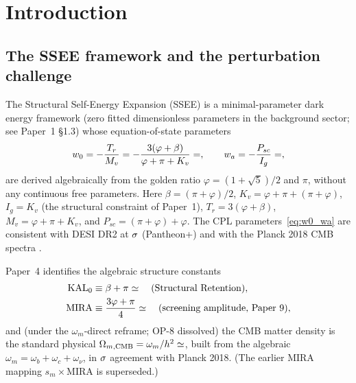 \documentclass[12pt,a4paper]{article}
\newcommand{\KALz}{\mathrm{KAL}_0}
\begin{document}
\clearpage
{\small\tableofcontents}
\clearpage

\section{Introduction}
\label{sec:intro}

\subsection{The SSEE framework and the perturbation challenge}
\label{subsec:intro_ssee}

The Structural Self-Energy Expansion (SSEE) \citep{SSEE_Paper1} is a
minimal-parameter dark energy framework (zero fitted dimensionless parameters
in the background sector; see Paper~1 \S1.3) whose equation-of-state parameters
\begin{equation}
  w_0 = -\frac{T_r}{M_v}
  = -\frac{3(\varphi+\beta)}{\varphi+\pi+K_v}
  = \val{W0_d6}, \qquad
  w_a = -\frac{P_{sc}}{I_g} = \val{WA_d6},
  \label{eq:w0_wa}
\end{equation}
are derived algebraically from the golden ratio $\varphi=(1+\sqrt{5})/2$ and $\pi$,
without any continuous free parameters.
Here $\beta=(\pi+\varphi)/2$, $K_v=\varphi+\pi+(\pi+\varphi)$, $I_g = K_v$ (the
structural constraint of Paper~1),
$T_r=3(\varphi+\beta)$, $M_v=\varphi+\pi+K_v$, and $P_{sc}=(\pi+\varphi)+\varphi$.
The CPL parameters~\eqref{eq:w0_wa} \citep{ChevallierPolarski2001,Linder2003} are consistent with DESI DR2 at $\val{p2_w0wa_ssee_ec26}\sigma$ (Pantheon+)
\citep{SSEE_Paper2,AbdulKarim2025} and with the Planck 2018 CMB spectra \citep{SSEE_Paper3}.

Paper~4 \citep{SSEE_Paper4} identifies the algebraic structure constants
\begin{align}
  \KALz &\equiv \beta + \pi \simeq \val{KAL0_d4}
  \quad\text{(Structural Retention)}, \\
  \mathrm{MIRA} &\equiv \frac{3\varphi+\pi}{4} \simeq \val{MIRA_d4}
  \quad\text{(screening amplitude, Paper~9)},
\end{align}
and (under the $\omega_m$-direct reframe; OP-8 dissolved) the CMB matter
density is the standard physical $\Omega_{m,\mathrm{CMB}} = \omega_m/h^2
\simeq \val{OMEGA_M_TOTAL_d6}$, built from the algebraic
$\omega_m=\omega_b+\omega_c+\omega_\nu$, in $\val{om_planck_sig}\sigma$ agreement with
Planck 2018. (The earlier MIRA mapping $s_m\times\mathrm{MIRA}$
is superseded.)
\end{document}
